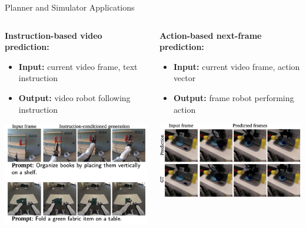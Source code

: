 \documentclass{beamer}
\begin{document}
\begin{frame}{Planner and Simulator Applications}
    \vspace{-1em}
	\begin{columns}[t]
		\begin{column}{.5\textwidth}
            \small
            \textbf{Instruction-based video prediction:}
            \begin{itemize}
                \item \textbf{Input:} current video frame, text instruction
                \item \textbf{Output:} video robot following instruction
            \end{itemize}
            \begin{center}
                \includegraphics[width=1.0\textwidth]{./img/post_inst.png}
            \end{center}
		\end{column}
		\begin{column}{.5\textwidth}
            \small
            \textbf{Action-based next-frame prediction:}
            \begin{itemize}
                \item \textbf{Input:} current video frame, action vector
                \item \textbf{Output:} frame robot performing action 
            \end{itemize}
            \begin{center}
                \includegraphics[width=1.0\textwidth]{./img/post_action.png}

\end{center}
\end{column}
\end{columns}
\end{frame}
\end{document}
